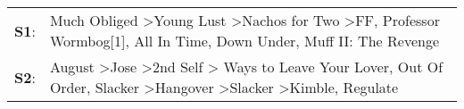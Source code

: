 \begin{supertabular}{p{0.03\textwidth}p{0.92\textwidth}}
 \textbf{S1}:  &                                                                                          Much Obliged\textsuperscript{} \textgreater \enspace Young Lust\textsuperscript{} \textgreater \enspace Nachos for Two\textsuperscript{} \textgreater \enspace FF\textsuperscript{}, \enspace Professor Wormbog[1]\textsuperscript{}, \enspace All In Time\textsuperscript{}, \enspace Down Under\textsuperscript{}, \enspace Muff II: The Revenge\textsuperscript{}  \enspace  \\
 \textbf{S2}:  &  August\textsuperscript{} \textgreater \enspace Jose\textsuperscript{} \textgreater \enspace 2nd Self\textsuperscript{} \textgreater {} Ways to Leave Your Lover\textsuperscript{}, \enspace Out Of Order\textsuperscript{}, \enspace Slacker\textsuperscript{} \textgreater \enspace Hangover\textsuperscript{} \textgreater \enspace Slacker\textsuperscript{} \textgreater \enspace Kimble\textsuperscript{}, \enspace Regulate\textsuperscript{}  \enspace  \\
\end{supertabular}
